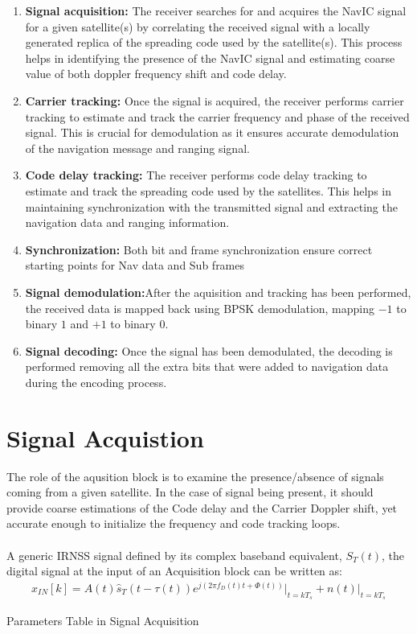\begin{enumerate}
	\item \textbf{Signal acquisition:} The receiver searches for and acquires the NavIC signal for a given satellite(s) by correlating the received signal with a locally generated replica of the spreading code used by the satellite(s). This process helps in identifying the presence of the NavIC signal and estimating coarse value of both doppler frequency shift and code delay.
\item \textbf{Carrier tracking:} Once the signal is acquired, the receiver performs carrier tracking to estimate and track the carrier frequency and phase of the received signal. This is crucial for demodulation as it ensures accurate demodulation of the navigation message and ranging signal.
\item \textbf{Code delay tracking:} The receiver performs code delay tracking to estimate and track the spreading code used by the satellites. This helps in maintaining synchronization with the transmitted signal and extracting the navigation data and ranging information.
\item \textbf{Synchronization:} Both bit and frame synchronization ensure correct starting points for Nav data and Sub frames  
\item \textbf{Signal demodulation:}After the aquisition and tracking has been performed, the received data is mapped back using BPSK demodulation, mapping $-1$ to binary $1$ and $+1$ to binary $0$.
\item \textbf{Signal decoding:} Once the signal has been demodulated, the decoding is performed removing all the extra bits that were added to navigation data during the encoding process.
\end{enumerate}

\section{Signal Acquistion}
The role of the aqusition block is to examine the presence/absence of signals coming from a given satellite. In the case of signal being present, it should provide coarse estimations of the Code delay and the Carrier Doppler shift, yet accurate enough to initialize the frequency and code tracking loops.
\\
\\
A generic IRNSS signal defined by its complex baseband equivalent, 
$S_T(t)$, the digital signal at the input of an Acquisition block can be written as:
\begin{align}
	x_{IN}[k]=A(t)\hat s_T (t-\tau(t))e^{j(2 \pi f_D(t)t+\Phi(t))}\bigg|_{t=kT_s} +n(t)\bigg|_{t=kT_s}
\end{align}
\begin{table}[h]

\vspace{3mm}
\caption{Parameters Table in Signal Acquisition}
\label{table:table_para}
\end{table}

